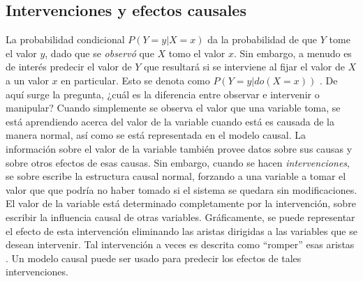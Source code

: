 



\subsection{Intervenciones y efectos causales}

La probabilidad condicional $P(Y=y| X=x)$ da la probabilidad de que $Y$ tome el valor $y$, dado que se \textit{observó} que $X$  tomo el valor $x$. 
Sin embargo, a menudo es de interés predecir el valor de $Y$ que resultará
si se interviene al fijar el valor de $X$ a un valor $x$ en particular. Esto
se denota como $P(Y=y| do(X=x))$ \cite{pearl_2009}.
De aquí surge la pregunta, ¿cuál es la diferencia entre observar e intervenir o
manipular? Cuando simplemente se observa el valor que una variable toma, se está aprendiendo acerca del valor de la 
variable cuando está es causada de la manera normal, así como se está representada en el modelo causal.
La información sobre el valor de la variable también provee
datos sobre sus causas y sobre otros efectos de esas causas.
Sin embargo, cuando se hacen \textit{intervenciones},
se sobre escribe la estructura causal normal, forzando a una
variable a tomar el valor que que podría no haber tomado 
si el sistema se quedara sin modificaciones.
El valor de la variable está determinado completamente por 
la intervención, sobre escribir la influencia causal de otras variables. Gráficamente, se puede representar el
efecto de esta intervención eliminando las aristas 
dirigidas a las variables que se desean intervenir. Tal
intervención a veces es descrita como ``romper'' esas aristas \cite{sep-causal-models}.
Un modelo causal puede ser usado para predecir
los efectos de tales intervenciones. 


